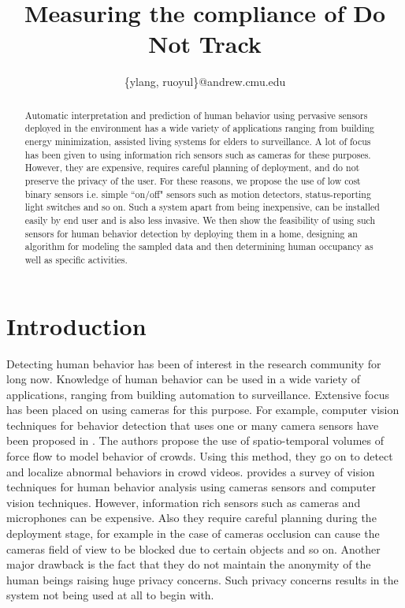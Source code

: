 \documentclass[10pt, conference, compsocconf]{IEEEtran}
\begin{document}
\title{Measuring the compliance of Do Not Track 
}

\author{

\{ylang, ruoyul\}@andrew.cmu.edu\vspace{-20pt}\\
}

\maketitle

\begin{abstract}
Automatic interpretation and prediction of human behavior using pervasive sensors deployed in the environment has a wide variety of applications ranging from building energy minimization, assisted living systems for elders to surveillance. A lot of focus has been given to using information rich sensors such as cameras for these purposes. However, they are expensive, requires careful planning of deployment, and do not preserve the privacy of the user. For these reasons, we propose the use of low cost binary sensors i.e. simple ``on/off" sensors such as motion detectors, status-reporting light switches and so on. Such a system apart from being inexpensive, can be installed easily by end user and is also less invasive. We then show the feasibility of using such sensors for human behavior detection by deploying them in a home, designing an algorithm for modeling the sampled data and then determining human occupancy as well as specific activities. 
\end{abstract}


\section{Introduction}

Detecting human behavior has been of interest in the research community for long now. Knowledge of human behavior can be used in a wide variety of applications, ranging from building automation to surveillance. 
Extensive focus has been placed on using cameras for this purpose. For example, computer vision techniques for behavior detection that uses one or many camera sensors have been proposed in \cite{1}. The authors propose the use of spatio-temporal volumes of force flow to model behavior of crowds. Using this method, they go on to detect and localize abnormal behaviors in crowd videos. \cite{2} provides a survey of vision techniques for human behavior analysis using cameras sensors and computer vision techniques. However, information rich sensors such as cameras and microphones can be expensive. Also they require careful planning during the deployment stage, for example in the case of cameras occlusion can cause the cameras field of view to be blocked due to certain objects and so on. Another major drawback is the fact that they do not maintain the anonymity of the human beings raising huge privacy concerns. Such privacy concerns results in the system not being used at all to begin with.
\end{document}

